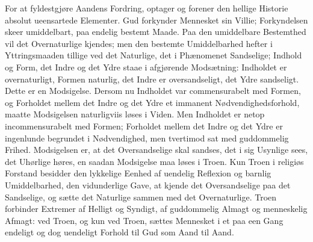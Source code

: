 \documentclass[12pt]{book}
\begin{document}
For at fyldestgjøre Aandens Fordring, optager og forener den hellige
Historie absolut ueensartede Elementer. Gud forkynder Mennesket sin
Villie; Forkyndelsen skeer umiddelbart, paa endelig bestemt Maade.
Paa den umiddelbare Bestemthed vil det Overnaturlige kjendes; men
den bestemte Umiddelbarhed hefter i Yttringsmaaden tillige ved det
Naturlige, det i Phænomenet Sandselige; Indhold og Form, det Indre
og det Ydre staae i afgjørende Modsætning: Indholdet er
overnaturligt, Formen naturlig, det Indre er oversandseligt, det
Ydre sandseligt. Dette er en Modsigelse. Dersom nu Indholdet var
commensurabelt med Formen, og Forholdet mellem det Indre og det Ydre
et immanent Nødvendighedsforhold, maatte Modsigelsen naturligviis
løses i Viden. Men Indholdet er netop incommensurabelt med Formen;
Forholdet mellem det Indre og det Ydre er ingenlunde begrundet i
Nødvendighed, men tvertimod sat med guddommelig Frihed. Modsigelsen
er, at det Oversandselige skal sandses, det i sig Usynlige sees, det
Uhørlige høres, en saadan Modsigelse maa løses i Troen. Kun Troen i
religiøs Forstand besidder den lykkelige Eenhed af uendelig
Reflexion og barnlig Umiddelbarhed, den vidunderlige
Gave, at kjende det Oversandselige paa det Sandselige, og sætte det
Naturlige sammen med det Overnaturlige. Troen forbinder Extremer af
Helligt og Syndigt, af guddommelig Almagt og menneskelig Afmagt: ved
Troen, og kun ved Troen, sættes Mennesket i et paa een Gang endeligt
og dog uendeligt Forhold til Gud som Aand til Aand.
\end{document}
